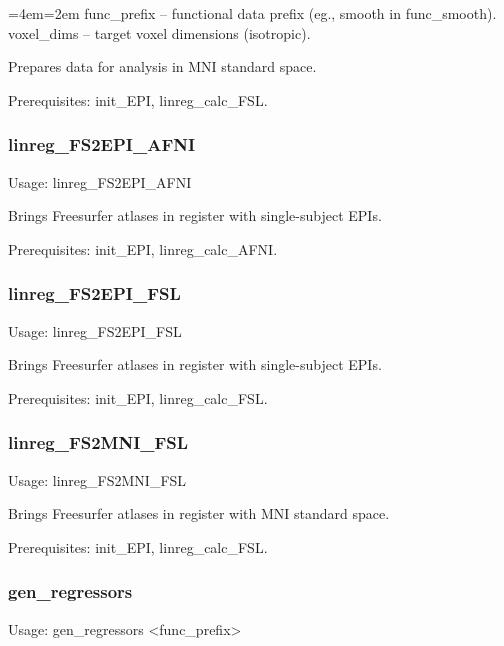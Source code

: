 \documentclass[final,titlepage,letterpaper,oneside,12pt]{article}
\renewcommand{\texttt}[2][BrickRed]{\textcolor{#1}{\ttfamily #2}}%
\newenvironment{blockquote}{%
  \par%
  \medskip
  \leftskip=4em\rightskip=2em%
  \noindent\ignorespaces}{%
  \par\medskip}
\begin{document}
\begin{blockquote}
func\_prefix -- functional data prefix (eg., smooth in func\_smooth). \\
voxel\_dims -- target voxel dimensions (isotropic). \
\end{blockquote}

\noindent Prepares data for analysis in MNI standard space.

Prerequisites: \texttt{init\_EPI}, \texttt{linreg\_calc\_FSL}.

\subsubsection{linreg\_FS2EPI\_AFNI}
Usage: \texttt{linreg\_FS2EPI\_AFNI}

\noindent Brings Freesurfer atlases in register with single-subject EPIs.

Prerequisites: \texttt{init\_EPI}, \texttt{linreg\_calc\_AFNI}.

\subsubsection{linreg\_FS2EPI\_FSL}
Usage: \texttt{linreg\_FS2EPI\_FSL}

\noindent Brings Freesurfer atlases in register with single-subject EPIs.

Prerequisites: \texttt{init\_EPI}, \texttt{linreg\_calc\_FSL}.

\subsubsection{linreg\_FS2MNI\_FSL}
Usage: \texttt{linreg\_FS2MNI\_FSL}

\noindent Brings Freesurfer atlases in register with MNI standard space.

Prerequisites: \texttt{init\_EPI}, \texttt{linreg\_calc\_FSL}.

\subsubsection{gen\_regressors}
Usage: \texttt{gen\_regressors <func\_prefix>}
\end{document}
